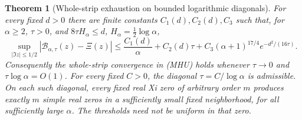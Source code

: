 \documentclass[11pt]{article}
\newtheorem{theorem}{Theorem}
\theoremstyle{remark}\newtheorem{remark}[theorem]{Remark}
\begin{document}
\begin{theorem}[Whole-strip exhaustion on bounded logarithmic diagonals]
\label{thm:mehler-logarithmic-heat}
For every fixed $d>0$ there are finite constants $C_1(d),C_2(d),C_3$
such that, for $\alpha\ge2$, $\tau>0$, and
$8\tau H_\alpha\le d$, $H_\alpha=\tfrac12\log\alpha$,
\[
 \sup_{|\Im z|\le1/2}|\mathcal B_{\alpha,\tau}(z)-\Xi(z)|
 \le\frac{C_1(d)}{\alpha}+C_2(d)\tau+
               C_3(\alpha+1)^{17/4}e^{-d^2/(16\tau)}.    \tag{TM1}
\]
Consequently the whole-strip convergence in (MHU) holds whenever
$\tau\to0$ and $\tau\log\alpha=O(1)$.
For every fixed $C>0$, the diagonal $\tau=C/\log\alpha$ is
admissible. On each such diagonal, every fixed real Xi zero of
arbitrary order $m$ produces exactly $m$ simple real zeros in
a sufficiently small fixed neighborhood, for all sufficiently
large $\alpha$. The thresholds need not be uniform in that zero.
\end{theorem}
\end{document}
